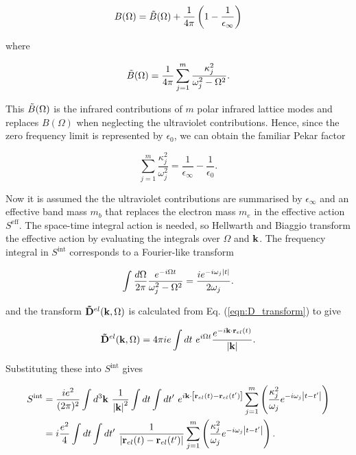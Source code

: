 \begin{equation}
    B(\Omega) = \Tilde{B}(\Omega) + \frac{1}{4\pi} \left( 1 - \frac{1}{\epsilon_\infty} \right)
\end{equation}

where

\begin{equation}
\Tilde{B}(\Omega) = \frac{1}{4\pi} \sum_{j=1}^m \frac{\kappa_j^2}{\omega_j^2 - \Omega^2}.  
\end{equation}

This $\Tilde{B}(\Omega)$ is the infrared contributions of $m$ polar infrared lattice modes and replaces $B(\Omega)$ when neglecting the ultraviolet contributions. Hence, since the zero frequency limit is represented by $\epsilon_0$, we can obtain the familiar Pekar factor

\begin{equation}
    \sum_{j=1}^m \frac{\kappa_j^2}{\omega_j^2} = \frac{1}{\epsilon_\infty} - \frac{1}{\epsilon_0}.
\end{equation}

Now it is assumed the the ultraviolet contributions are summarised by $\epsilon_\infty$ and an effective band mass $m_b$ that replaces the electron mass $m_e$ in the effective action $S^{\text{eff}}$. The space-time integral action is needed, so  Hellwarth and Biaggio transform the effective action by evaluating the integrals over $\Omega$ and $\vb{k}$. The frequency integral in $S^{\text{int}}$ corresponds to a Fourier-like transform

\begin{equation}
    \int \frac{d\Omega}{2\pi} \frac{e^{-i\Omega t}}{\omega_j^2 - \Omega^2} = \frac{i e^{-i\omega_j \abs{t}}}{2\omega_j}.
\end{equation}

and the transform $\vb{\Tilde{D}}^{el}(\vb{k}, \Omega)$ is calculated from Eq. (\ref{eqn:D_transform}) to give

\begin{equation}
    \vb{\Tilde{D}}^{el}(\vb{k}, \Omega) = 4\pi i e \int dt\ e^{i\Omega t} \frac{e^{-i\vb{k} \cdot \vb{r}_{el}(t)}}{\abs{\vb{k}}}.
\end{equation}

Substituting these into $S^{\text{int}}$ gives

\begin{equation}
    \begin{aligned}
        S^{\text{int}} &= \frac{i e^2}{(2\pi)^2} \int d^3 \vb{k}\ \frac{1}{\abs{\vb{k}}^2} \int dt \int dt'\ e^{i\vb{k} \cdot \left[ \vb{r}_{el}(t) - \vb{r}_{el}(t') \right]} \sum_{j = 1}^m \left( \frac{\kappa_j^2}{\omega_j} e^{-i\omega_j\abs{t-t'}} \right) \\
        &= i \frac{e^2}{4} \int dt \int dt'\ \frac{1}{\abs{\vb{r}_{el}(t) - \vb{r}_{el}(t')}} \sum_{j=1}^m \left( \frac{\kappa_j^2}{\omega_j} e^{-i\omega_j\abs{t-t'}} \right).
    \end{aligned}
\end{equation}

